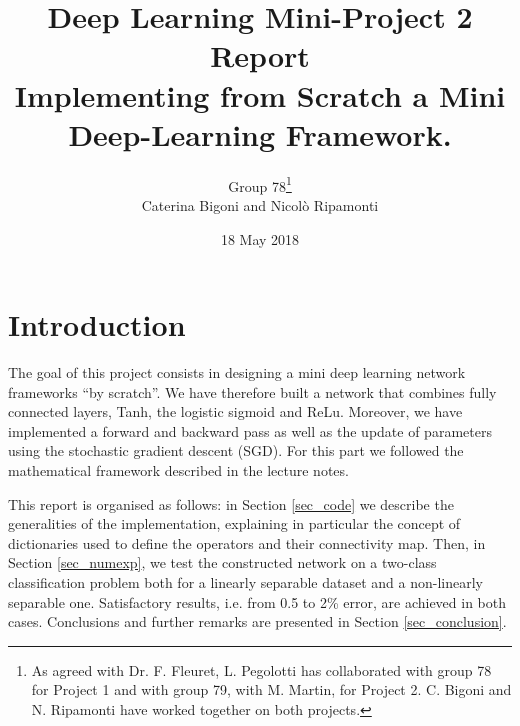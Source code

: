 \documentclass{article}
\begin{document}
\title{Deep Learning Mini-Project 2 Report \\ Implementing from Scratch a Mini Deep-Learning Framework.}
\author{Group 78\footnote{As agreed with Dr. F. Fleuret, L. Pegolotti has collaborated with group 78 for Project 1 and with group 79, with M. Martin, for Project 2. C. Bigoni and N. Ripamonti have worked together on both projects.}  \\ Caterina Bigoni and Nicol\`o Ripamonti}
\date{18 May 2018}
\maketitle





\section{Introduction}
The goal of this project consists in designing a mini deep learning network frameworks ``by scratch''. 
We have therefore built a network that combines fully connected layers, Tanh, the logistic sigmoid and ReLu. 
Moreover, we have implemented a forward and backward pass as well as the update of parameters using the stochastic gradient descent (SGD).
For this part we followed the mathematical framework described in the lecture notes. 

This report is organised as follows: in Section \ref{sec_code} we describe the generalities of the implementation, explaining in particular the concept of dictionaries used to define the operators and their connectivity map. 
Then, in  Section \ref{sec_numexp}, we test the constructed network on a two-class classification problem both for a linearly separable dataset and a non-linearly separable one.
Satisfactory results, i.e. from 0.5 to 2\% error, are achieved in both cases. 
Conclusions and further remarks are presented in Section \ref{sec_conclusion}.
\end{document}
